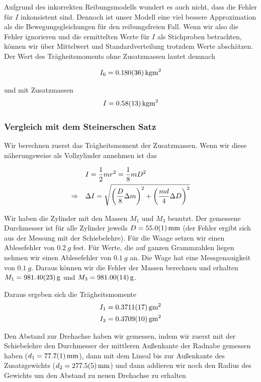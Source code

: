 \documentclass[a4paper,german,12pt,smallheadings]{scrartcl}
\begin{document}
Aufgrund des inkorrekten Reibungsmodells wundert es auch nicht, dass die Fehler
für $I$ inkonsistent sind. Dennoch ist unser Modell eine viel bessere
Approximation als die Bewegungsgleichungen für den reibungsfreien Fall. Wenn
wir also die Fehler ignorieren und die ermittelten Werte für $I$ als
Stichproben betrachten, können wir über Mittelwert und Standardverteilung
trotzdem Werte abschätzen. Der Wert des Trägheitsmoments ohne Zusatzmassen
lautet demnach

\begin{equation}
  I_0 = \SI{0.180+-0.036}{kg m^2}
\end{equation}

und mit Zusatzmassen
\begin{equation}
  I = \SI{0.58+-0.13}{kg m^2}
\end{equation}

\subsubsection{Vergleich mit dem Steinerschen Satz}
Wir berechnen zuerst das Trägheitsmoment der Zusatzmassen. Wenn wir diese
näherungsweise als Vollzylinder annehmen ist das

\begin{align}
  &I = \frac{1}{2} m r^2 = \frac{1}{8} mD^2 \\
  \Rightarrow \quad
  &\Delta I = \sqrt{\del{\frac{D}{8} \Delta m}^2 + \del{\frac{md}{4} \Delta D}^2}
\end{align}

Wir haben die Zylinder mit den Massen $M_1$ und $M_3$ benutzt. Der gemessene
Durchmesser ist für alle Zylinder jeweils $D = \SI{55.0+-0.1}{mm}$ (der Fehler
ergibt sich aus der Messung mit der Schiebelehre). Für die Waage setzen wir
einen Ablesefehler von $\SI{0.2}{g}$ fest. Für Werte, die auf ganzen
Grammzahlen liegen nehmen wir einen Ablesefehler von $\SI{0.1}{g}$ an.  Die
Wage hat eine Messgenauigkeit von $\SI{0.1}{g}$. Daraus können wir die Fehler
der Massen berechnen und erhalten $M_1 = \SI{981.4+-0.23}{g}$ und $M_3 =
\SI{981.0+-0.14}{g}$.

Daraus ergeben sich die Trägheitsmomente
\begin{align*}
  I_1 &= \SI{0.3711+-0.0017}{g m^2} \\
  I_3 &= \SI{0.3709+-0.0010}{g m^2}
\end{align*}

Den Abstand zur Drehachse haben wir gemessen, indem wir zuerst mit der
Schiebelehre den Durchmesser der mittleren Außenkante der Radnabe gemessen
haben ($d_1 = \SI{77.7+-0.1}{mm}$), dann mit dem Lineal bis zur Außenkante des
Zusatzgewichts ($d_2 = \SI{277.5+-0.5}{mm}$) und dann addieren wir noch den
Radius des Gewichts um den Abstand zu neuen Drehachse zu erhalten
\end{document}
